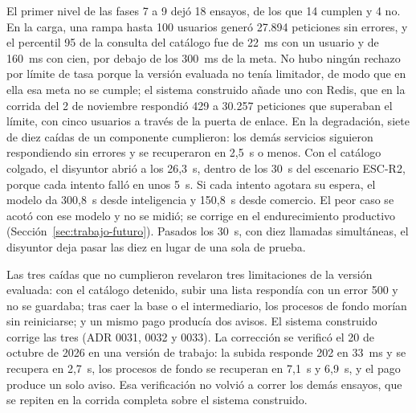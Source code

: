 El primer nivel de las fases 7 a 9 dejó 18 ensayos, de los que 14 cumplen y 4 no. En la carga, una
rampa hasta 100 usuarios generó 27.894 peticiones sin errores, y el percentil 95 de la consulta del
catálogo fue de 22~ms con un usuario y de 160~ms con cien, por debajo de los 300~ms de la meta. No
hubo ningún rechazo por límite de tasa porque la versión evaluada no tenía limitador, de modo que en
ella esa meta no se cumple; el sistema construido añade uno con Redis, que en la corrida del 2 de noviembre respondió 429 a
30.257 peticiones que superaban el límite, con cinco usuarios a través de la puerta de enlace. En la degradación, siete de diez caídas de un componente cumplieron: los demás servicios
siguieron respondiendo sin errores y se recuperaron en 2,5~s o menos. Con el catálogo colgado, el
disyuntor abrió a los 26,3~s, dentro de los 30~s del escenario ESC-R2, porque cada intento falló
en unos 5~s. Si cada intento agotara su espera, el modelo da 300,8~s desde inteligencia y 150,8~s
desde comercio. El peor caso se acotó con ese modelo y no se midió; se corrige en el endurecimiento productivo
(Sección~\ref{sec:trabajo-futuro}). Pasados los
30~s, con diez llamadas simultáneas, el disyuntor deja pasar las diez en lugar de una sola de
prueba.

Las tres caídas que no cumplieron revelaron tres limitaciones de la versión evaluada: con el
catálogo detenido, subir una lista respondía con un error 500 y no se guardaba; tras caer la base o
el intermediario, los procesos de fondo morían sin reiniciarse; y un mismo pago producía dos avisos.
El sistema construido corrige las tres (ADR 0031, 0032 y 0033). La corrección se verificó el 20 de
octubre de 2026 en una versión de trabajo: la subida responde 202 en 33~ms y se recupera en 2,7~s,
los procesos de fondo se recuperan en 7,1~s y 6,9~s, y el pago produce un solo aviso. Esa
verificación no volvió a correr los demás ensayos, que se repiten en la corrida completa sobre el
sistema construido.


